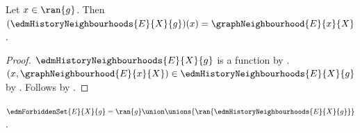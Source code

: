 \begin{proposition}\label{edm_history_neighbourhoods_apply}
    Let $x\in\ran{g}$.
    Then $(\edmHistoryNeighbourhoods{E}{X}{g})(x)
        =\graphNeighbourhood{E}{x}{X}$.
\end{proposition}
\begin{proof}
    $\edmHistoryNeighbourhoods{E}{X}{g}$ is a function by
        .
    $(x,\graphNeighbourhood{E}{x}{X})
        \in\edmHistoryNeighbourhoods{E}{X}{g}$ by
        .
    Follows by .
\end{proof}

\begin{definition}\label{edm_forbidden_set}
    $\edmForbiddenSet{E}{X}{g}
        =\ran{g}\union
            \unions{\ran{\edmHistoryNeighbourhoods{E}{X}{g}}}$.
\end{definition}

